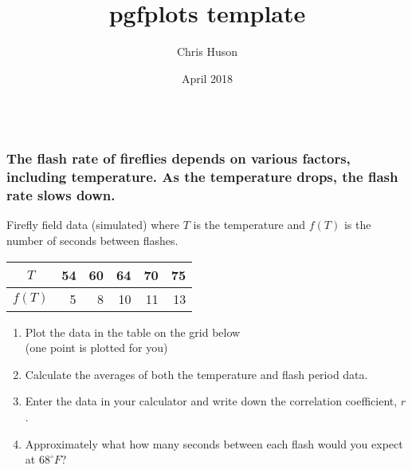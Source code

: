 \documentclass[12pt, oneside]{article}
\title{pgfplots template}
\author{Chris Huson}
\date{April 2018}
\begin{document}
\subsubsection*{\\ \textnormal{The flash rate of fireflies depends on various factors, including temperature. As the temperature drops, the flash rate slows down.
}}



Firefly field data (simulated) where $T$ is the temperature and $f(T)$ is the number of seconds between flashes. \\[10pt]
\begin{tabular}{|c|r|r|r|r|r|}
\hline
$T$ & 54 & 60 & 64 & 70 & 75 \\ [3pt]
\hline
$f(T)$ & 5 & 8 & 10 & 11 & 13  \\  [3pt]
\hline
\end{tabular}
\begin{enumerate}
    \item Plot the data in the table on the grid below \\
    (one point is plotted for you)
    \item Calculate the averages of both the temperature and flash period data. \\[50pt]
    \item Enter the data in your calculator and write down the correlation coefficient, $r$. \\[20pt]
    \item Approximately what how many seconds between each flash would you expect at $68^\circ F$?
\end{enumerate}

\vspace{0.5in}
{}


\end{document}
